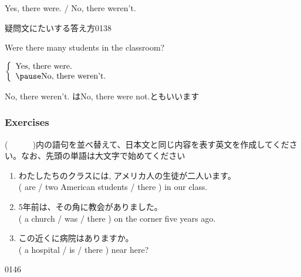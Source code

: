 \documentclass[aspectratio=169,xcolor={dvipsnames,table}]{beamer}
\newcommand{\myaudio}[1]{\href{#1}{\faVolumeUp}}
\begin{document}
 \begin{frame}[plain]{Yes, there were. / No, there weren't.}
 \Large

疑問文にたいする答え方\hfill{\tiny 0138}\,{\scriptsize \myaudio{./audio/001_there_is_12.mp3}}
\vspace{10pt}

\pause

Were there many students in the classroom?

\pause

$\left\{\begin{array}{l}
	 \text{Yes, there were.}\\\pause
         \text{No, there weren't.}
	\end{array}\right.$

\pause

\mbox{}\hfill{}{\small No, there weren't. はNo, there were not.ともいいます}
\end{frame}
\begin{frame}[plain]\frametitle{Exercises}
(~~~~~~)内の語句を並べ替えて、日本文と同じ内容を表す英文を作成してください。なお、先頭の単語は大文字で始めてください

  \begin{enumerate}
   \item わたしたちのクラスには,
アメリカ人の生徒が二人います。\\
         ( are / two American students / there ) in our class.\\
            \item 5年前は、その角に教会がありました。\\
         ( a church / was / there ) on the corner five years ago.\\
            \item この近くに病院はありますか。\\
         ( a hospital / is / there ) near here?\\
  \end{enumerate}
\hfill{\tiny 0146}\,{\scriptsize \myaudio{./audio/001_there_is_13.mp3}}
\end{frame}
\end{document}
